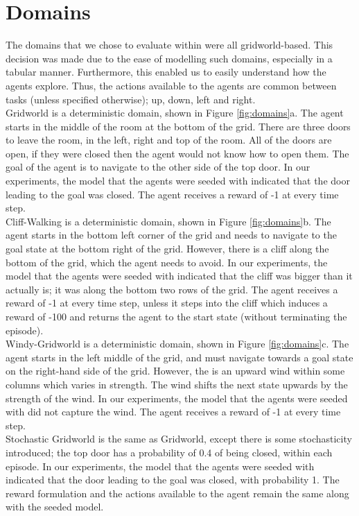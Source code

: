 \section{Domains}
The domains that we chose to evaluate within were all gridworld-based. This decision was made due to the ease of modelling such domains, especially in a tabular manner. Furthermore, this enabled us to easily understand how the agents explore. Thus, the actions available to the agents are common between tasks (unless specified otherwise); up, down, left and right.
\\Gridworld is a deterministic domain, shown in Figure \ref{fig:domains}a. The agent starts in the middle of the room at the bottom of the grid. There are three doors to leave the room, in the left, right and top of the room. All of the doors are open, if they were closed then the agent would not know how to open them. The goal of the agent is to navigate to the other side of the top door. In our experiments, the model that the agents were seeded with indicated that the door leading to the goal was closed. The agent receives a reward of -1 at every time step.
\\Cliff-Walking \cite{Sutton1998} is a deterministic domain, shown in Figure \ref{fig:domains}b. The agent starts in the bottom left corner of the grid and needs to navigate to the goal state at the bottom right of the grid. However, there is a cliff along the bottom of the grid, which the agent needs to avoid. In our experiments, the model that the agents were seeded with indicated that the cliff was bigger than it actually is; it was along the bottom two rows of the grid. The agent receives a reward of -1 at every time step, unless it steps into the cliff which induces a reward of -100 and returns the agent to the start state (without terminating the episode).
\\Windy-Gridworld \cite{Sutton1998} is a deterministic domain, shown in Figure \ref{fig:domains}c. The agent starts in the left middle of the grid, and must navigate towards a goal state on the right-hand side of the grid. However, the is an upward wind within some columns which varies in strength. The wind shifts the next state upwards by the strength of the wind. In our experiments, the model that the agents were seeded with did not capture the wind. The agent receives a reward of -1 at every time step.
\\Stochastic Gridworld is the same as Gridworld, except there is some stochasticity introduced; the top door has a probability of 0.4 of being closed, within each episode. In our experiments, the model that the agents were seeded with indicated that the door leading to the goal was closed, with probability 1. The reward formulation and the actions available to the agent remain the same along with the seeded model.
